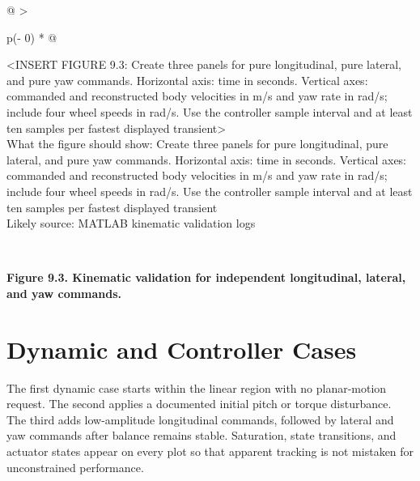 \begin{longtable}[]{@{}
  >{\raggedright\arraybackslash}p{(\columnwidth - 0\tabcolsep) * }@{}}
\toprule\noalign{}
\begin{minipage}[b]{\linewidth}\raggedright
\textless INSERT FIGURE 9.3: Create three panels for pure longitudinal,
pure lateral, and pure yaw commands. Horizontal axis: time in seconds.
Vertical axes: commanded and reconstructed body velocities in m\slash{}s and
yaw rate in rad\slash{}s; include four wheel speeds in rad\slash{}s. Use the
controller sample interval and at least ten samples per fastest
displayed transient\textgreater{}\\
What the figure should show: Create three panels for pure longitudinal,
pure lateral, and pure yaw commands. Horizontal axis: time in seconds.
Vertical axes: commanded and reconstructed body velocities in m\slash{}s and
yaw rate in rad\slash{}s; include four wheel speeds in rad\slash{}s. Use the
controller sample interval and at least ten samples per fastest
displayed transient\\
Likely source: MATLAB kinematic validation logs\strut
\end{minipage} \\
\midrule\noalign{}
\endhead
\bottomrule\noalign{}
\endlastfoot
\end{longtable}

\begin{center}\singlespacing
{}
\textbf{Figure 9.3. Kinematic validation for independent longitudinal, lateral, and yaw commands.}
\end{center}

\section{Dynamic and Controller Cases}\label{dynamic-and-controller-cases}

The first dynamic case starts within the linear region with no
planar-motion request. The second applies a documented initial pitch or
torque disturbance. The third adds low-amplitude longitudinal commands,
followed by lateral and yaw commands after balance remains stable.
Saturation, state transitions, and actuator states appear on every plot
so that apparent tracking is not mistaken for unconstrained performance.

